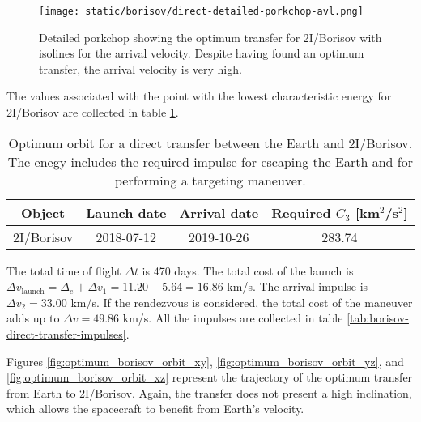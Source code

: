 \begin{figure}[H]
  \centering
  \texttt{[image: static/borisov/direct-detailed-porkchop-avl.png]}
  \caption[Detailed porkchop showing the optimum trasnfer for 2I/Borisov
    with the arrival velocity]{Detailed porkchop showing the optimum transfer for
    2I/Borisov with isolines for the arrival velocity. Despite having found
    an optimum transfer, the arrival velocity is very high.}
  \label{fig:borisov-optimum-transfer-porkchop-avl}
\end{figure}

The values associated with the point with the lowest characteristic energy for
2I/Borisov are collected in table \ref{tab:borisov-direct-transfer-optimum}.

\vspace{1cm}
\begin{table}[H]
  \centering
  \begin{tabular}{|c|c|c|c|}
    \hline
    Object     & Launch date & Arrival date & Required $C_3$ [km$^2$/s$^2$] \\
    \hline
    2I/Borisov & 2018-07-12  & 2019-10-26   & 283.74                        \\
    \hline
  \end{tabular}
  \caption[Optimum orbit for a direct transfer between the Earth and
    2I/Borisov.]{Optimum orbit for a direct transfer between the Earth and
    2I/Borisov. The enegy includes the required impulse for escaping the Earth
    and for performing a targeting maneuver.}
  \label{tab:borisov-direct-transfer-optimum}
\end{table}

The total time of flight $\Delta t$ is 470 days. The total cost of the launch is
$\Delta v_\text{launch} = \Delta_e + \Delta v_1 = 11.20 + 5.64 = 16.86$ km/s.
The arrival impulse is $\Delta v_2 = 33.00$ km/s. If the rendezvous is
considered, the total cost of the maneuver adds up to $\Delta v = 49.86$ km/s.
All the impulses are collected in table
\ref{tab:borisov-direct-transfer-impulses}.

Figures \ref{fig:optimum_borisov_orbit_xy}, \ref{fig:optimum_borisov_orbit_yz},
and \ref{fig:optimum_borisov_orbit_xz} represent the trajectory of the optimum
transfer from Earth to 2I/Borisov. Again, the transfer does not present a high
inclination, which allows the spacecraft to benefit from Earth's velocity.

